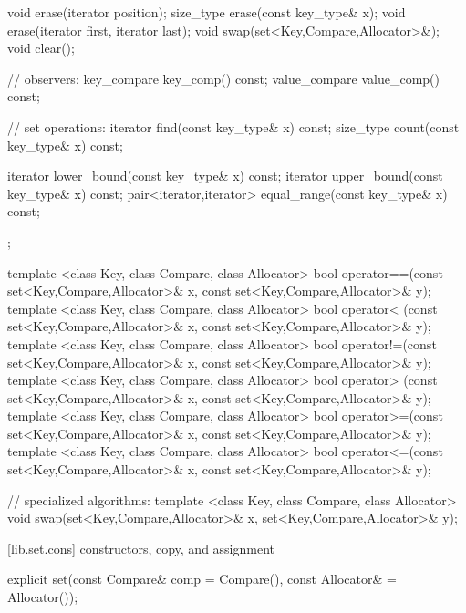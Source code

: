\begin{codeblock}
{{    void      erase(iterator position);
    size_type erase(const key_type& x);
    void      erase(iterator first, iterator last);
    void swap(set<Key,Compare,Allocator>&);
    void clear();

    // observers:
    key_compare   key_comp() const;
    value_compare value_comp() const;

    // set operations:
    iterator  find(const key_type& x) const;
    size_type count(const key_type& x) const;

    iterator  lower_bound(const key_type& x) const;
    iterator  upper_bound(const key_type& x) const;
    pair<iterator,iterator> equal_range(const key_type& x) const;
  };

  template <class Key, class Compare, class Allocator>
    bool operator==(const set<Key,Compare,Allocator>& x,
                    const set<Key,Compare,Allocator>& y);
  template <class Key, class Compare, class Allocator>
    bool operator< (const set<Key,Compare,Allocator>& x,
                    const set<Key,Compare,Allocator>& y);
  template <class Key, class Compare, class Allocator>
    bool operator!=(const set<Key,Compare,Allocator>& x,
                    const set<Key,Compare,Allocator>& y);
  template <class Key, class Compare, class Allocator>
    bool operator> (const set<Key,Compare,Allocator>& x,
                    const set<Key,Compare,Allocator>& y);
  template <class Key, class Compare, class Allocator>
    bool operator>=(const set<Key,Compare,Allocator>& x,
                    const set<Key,Compare,Allocator>& y);
  template <class Key, class Compare, class Allocator>
    bool operator<=(const set<Key,Compare,Allocator>& x,
                    const set<Key,Compare,Allocator>& y);

  // specialized algorithms:
  template <class Key, class Compare, class Allocator>
    void swap(set<Key,Compare,Allocator>& x,
              set<Key,Compare,Allocator>& y);
}
\end{codeblock}%
%

[lib.set.cons]{ constructors, copy, and assignment}

%
%
\begin{itemdecl}
explicit set(const Compare& comp = Compare(),
             const Allocator& = Allocator());
\end{itemdecl}

